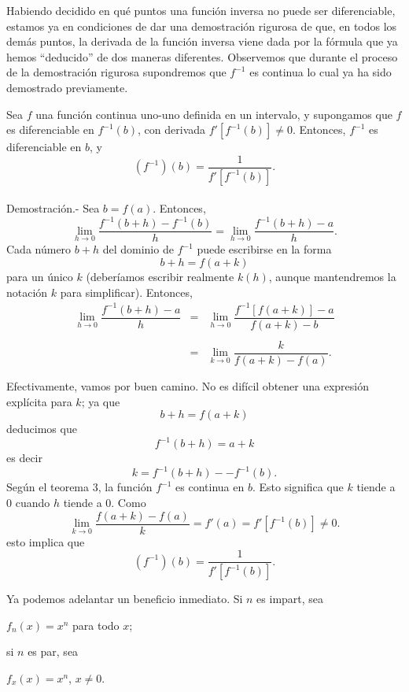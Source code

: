 Habiendo decidido en qué puntos una función inversa no puede ser diferenciable, es­tamos ya en condiciones de dar una demostración rigurosa de que, en todos los demás puntos, la derivada de la función inversa viene dada por la fórmula que ya hemos “deducido” de dos maneras diferentes. Observemos que durante el proceso de la demostración rigurosa supondremos que $f^{-1}$  es continua lo cual ya ha sido demostrado previamente.

\begin{teo}
    Sea $f$ una función continua uno-uno definida en un intervalo, y supongamos que $f$ es diferenciable en $f^{-1}(b)$, con derivada $f'\left[f^{-1}(b)\right]\neq 0$. Entonces, $f^{-1}$ es diferenciable en $b$, y
    $$\left(f^{-1}\right)(b)=\dfrac{1}{f'\left[f^{-1}(b)\right]}.$$\\
    Demostración.-\; Sea $b=f(a)$. Entonces,
    $$\lim_{h\to 0}\dfrac{f^{-1}(b+h)-f^{-1}(b)}{h}=\lim_{h\to 0}\dfrac{f^{-1}(b+h)-a}{h}.$$
    Cada número $b+h$ del dominio de $f^{-1}$ puede escribirse en la forma
    $$b+h=f(a+k)$$
    para un único $k$ (deberíamos escribir realmente $k(h)$, aunque mantendremos la notación $k$ para simplificar). Entonces,
    $$
    \begin{array}{rcl}
	\displaystyle\lim_{h\to 0}\dfrac{f^{-1}(b+h)-a}{h}&=&\displaystyle\lim_{h\to 0}\dfrac{f^{-1}\left[f(a+k)\right]-a}{f(a+k)-b}\\\\
							  &=& \displaystyle\lim_{k\to 0}\dfrac{k}{f(a+k)-f(a)}.\\\\
    \end{array}
    $$
    Efectivamente, vamos por buen camino. No es difícil obtener una expresión explícita para $k$; ya que
    $$b+h=f(a+k)$$
    deducimos que
    $$f^{-1}(b+h)=a+k$$
    es decir
    $$k=f^{-1}(b+h)--f^{-1}(b).$$
    Según el teorema 3, la función $f^{-1}$ es continua en $b$. Esto significa que $k$ tiende a $0$ cuando $h$ tiende a $0$. Como
    $$\lim_{k\to 0} \dfrac{f(a+k)-f(a)}{k}=f'(a)=f'\left[f^{-1}(b)\right]\neq 0.$$
    esto implica que
    $$\left(f^{-1}\right)(b)=\dfrac{1}{f'\left[f^{-1}(b)\right]}.$$
\end{teo}
\vspace{.3cm}
Ya podemos adelantar un beneficio inmediato. Si $n$ es impart, sea
\begin{center}
    $f_n(x)=x^n$ para todo $x$;
\end{center}
si $n$ es par, sea
\begin{center}
    $f_x(x)=x^n$, $x\neq 0$.
\end{center}

